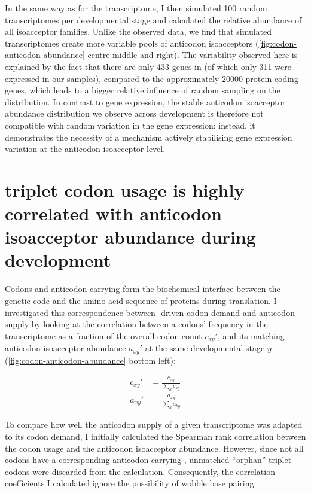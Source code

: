 In the same way as for the \mrna transcriptome, I then simulated \num{100}
random \trna transcriptomes per developmental stage and calculated the relative
abundance of all isoacceptor families. Unlike the observed \trna data, we find
that simulated \trna transcriptomes create more variable pools of anticodon
isoacceptors (\cref{fig:codon-anticodon-abundance} centre middle and right). The
variability observed here is explained by the fact that there are only \num{433}
\trna genes in \mmu (of which only \num{311} were expressed in our samples),
compared to the approximately \num{20000} protein-coding genes, which leads to a
bigger relative influence of random sampling on the distribution. In contrast to
\mrna gene expression, the stable anticodon isoacceptor abundance distribution
we observe across development is therefore not compatible with random variation
in the \trna gene expression: instead, it demonstrates the necessity of a
mechanism actively stabilising \trna gene expression variation at the anticodon
isoacceptor level.

\section{ triplet codon usage is highly correlated with 
anticodon isoacceptor abundance during development}

Codons and anticodon-carrying \trna[s] form the biochemical interface between
the genetic code and the amino acid sequence of proteins during \mrna
translation. I investigated this correspondence between \mrna-driven codon
demand and \trna anticodon supply by looking at the correlation between a
codons’ frequency in the \mrna transcriptome as a fraction of the overall codon
count \(c_{xy}'\), and its matching \trna anticodon isoacceptor abundance
\(a_{xy}'\) at the same developmental stage \(y\)
(\cref{fig:codon-anticodon-abundance} bottom left):

\begin{align}
    c_{xy}' &= \frac{c_{xy}}{\sum_k c_{ky}}\\
    a_{xy}' &= \frac{a_{xy}}{\sum_k a_{ky}}
\end{align}

To compare how well the anticodon supply of a given transcriptome was adapted to
its codon demand, I initially calculated the Spearman rank correlation between
the codon usage and the anticodon isoacceptor abundance. However, since not all
codons have a corresponding anticodon-carrying \trna, unmatched “orphan” triplet
codons were discarded from the calculation. Consequently, the correlation
coefficients I calculated ignore the possibility of wobble base pairing.

